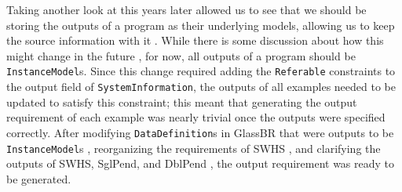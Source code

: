 Taking another look at this  years later allowed us to
see that we should be storing the outputs of a program as their underlying
models, allowing us to keep the source information with it
. While there is some discussion about how this might
change in the future , for now, all outputs of a program should be
\texttt{InstanceModel}s. Since this change required adding the
\texttt{Referable}  constraints to the output field of
\texttt{SystemInformation}, the outputs of all examples needed to be updated to
satisfy this constraint; this meant that generating the output requirement of
each example was nearly trivial once the outputs were specified correctly.
After modifying \texttt{DataDefinition}s in GlassBR that were outputs to be
\texttt{InstanceModel}s , reorganizing the requirements of
SWHS , and clarifying the outputs of SWHS, SglPend, and DblPend
, the output requirement was ready to be generated.
